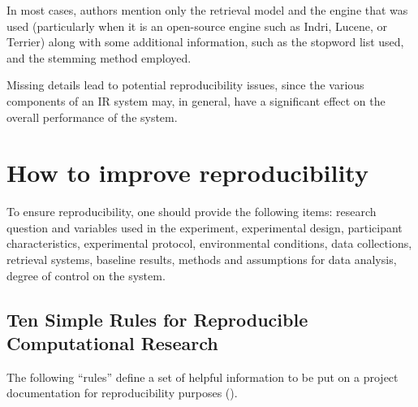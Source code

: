 In most cases, authors mention only the retrieval model and the engine that was used (particularly when it is an open-source engine such as Indri, Lucene, or Terrier) along with some additional information, such as the stopword list used, and the stemming method employed.

Missing details lead to potential reproducibility issues, since the various components of an IR system may, in general, have a significant effect on the overall performance of the system.

\section{How to improve reproducibility}

To ensure reproducibility, one should provide the following items: research question and variables used in the experiment, experimental design, participant characteristics, experimental protocol, environmental conditions, data collections, retrieval systems, baseline results, methods and assumptions for data analysis, degree of control on the system.

\subsection{Ten Simple Rules for Reproducible Computational Research}

The following ``rules'' define a set of helpful information to be put on a project documentation for reproducibility purposes (\cite{10reprule}).

